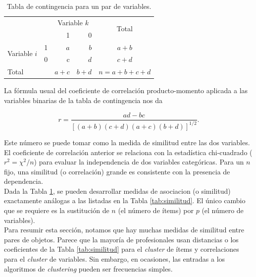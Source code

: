 \documentclass[a4paper, 20pt]{article}
\begin{document}
\begin{table}[h]
  \centering
  \caption{Tabla de contingencia para un par de variables.}
  \label{tab:contingencia_var}
\resizebox{7.5cm}{!} {
\begin{tabular}{llrrrr}
\toprule
\multicolumn{2}{l}{\multirow{2}{*}{}} & \multicolumn{2}{c}{Variable $k$} & \multicolumn{2}{c}{\multirow{2}{*}{Total}} \\\cmidrule{3-4}
\multicolumn{2}{l}{}                  & 1             & 0       & \multicolumn{2}{c}{}                        \\ \hline
\multirow{2}{*}{Variable $i$}       & 1      & $a$          & $b$       & \multicolumn{2}{c}{$a+b$}                     \\
                              & 0      & c            & $d$       & \multicolumn{2}{c}{$c+d$}                     \\ \hline
\multicolumn{2}{l}{Total}            & $a+c$          & $b+d$     & \multicolumn{2}{c}{$n=a+b+c+d$}\\
\bottomrule            
\end{tabular}
}
\end{table}

La fórmula usual del coeficiente de correlación producto-momento aplicada a las variables binarias de la tabla de contingencia nos da

$$r = \frac{ad-bc}{[(a+b)(c+d)(a+c)(b+d)]^{1/2}}.$$

Este número se puede tomar como la medida de similitud entre las dos variables.\\

El coeficiente de correlación anterior se relaciona con la estadística chi-cuadrado ($r^2=\chi^2/n$) para evaluar la independencia de dos variables categóricas. Para un $n$ fijo, una similitud (o correlación) grande es consistente con la presencia de dependencia.\\

Dada la Tabla \ref{tab:contingencia_var}, se pueden desarrollar medidas de asociacion (o similitud) exactamente análogas a las listadas en la Tabla \ref{tab:similitud}. El único cambio que se requiere es la sustitución de $n$ (el número de ítems) por $p$ (el número de variables).\\

Para resumir esta sección, notamos que hay muchas medidas de similitud entre pares de objetos. Parece que la mayoría de profesionales usan distancias o los coeficientes de la Tabla \ref{tab:similitud} para el \textit{cluster} de ítems y correlaciones para el \textit{cluster} de variables. Sin embargo, en ocasiones, las entradas a los algoritmos de \textit{clustering} pueden ser frecuencias simples.\\
\end{document}
